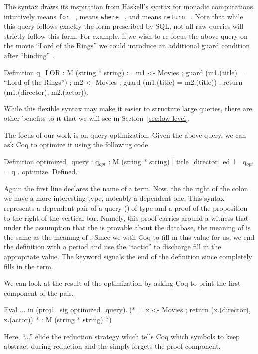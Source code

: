 \documentclass[preprint]{sigplanconf}
\newcommand{\FOR}{{\tt for} \ }
\newcommand{\WHERE}{{\tt where} \ }
\newcommand{\RETURN}{{\tt return} \ }
\begin{document}
The syntax draws its inspiration from Haskell's syntax for monadic computations.
\coqe{<-} intuitively means \FOR,  means \WHERE, and  means \RETURN.
Note that while this query follows exactly the form prescribed by SQL, not all raw queries will strictly follow this form.
For example, if we wish to re-focus the above query on the movie ``Lord of the Rings'' we could introduce an additional guard condition after ``binding'' .
\begin{coq}
Definition q_LOR : M (string * string) :=
  m1 <- Movies ;
  guard (m1.(title) = ``Lord of the Rings'') ;
  m2 <- Movies ;
  guard (m1.(title) = m2.(title)) ;
  return (m1.(director), m2.(actor)).
\end{coq}
While this flexible syntax may make it easier to structure large queries, there are other benefits to it that we will see in Section~\ref{sec:low-level}.

The focus of our work is on query optimization.
Given the above query, we can ask Coq to optimize it using the following code.
\begin{coq}
Definition optimized_query
: { q$_{opt}$ : M (string * string) | title_director_ed $\vdash$ q$_{opt}$ = q }.
optimize.
Defined.
\end{coq}
Again the first line declares the name of a term.
Now, the the right of the colon we have a more interesting type, noteably a dependent one.
This syntax represents a dependent pair of a query () of type  and a proof of the proposition to the right of the vertical bar.
Namely, this proof carries around a witness that under the assumption that the  is provable about the database, the meaning of  is the same as the meaning of .
Since we with Coq to fill in this value for us, we end the definition with a period and use the ``tactic''  to discharge fill in the appropriate value.
The keyword  signals the end of the definition since  completely fills in the term.

We can look at the result of the optimization by asking Coq to print the first component of the pair.
\begin{coq}
Eval ... in (proj1_sig optimized_query).
(* = x <- Movies ; return (x.(director), x.(actor))
 *   : M (string * string)
 *)
\end{coq}
Here, ``...'' elide the reduction strategy which tells Coq which symbols to keep abstract during reduction and the  simply forgets the proof component.
\end{document}
